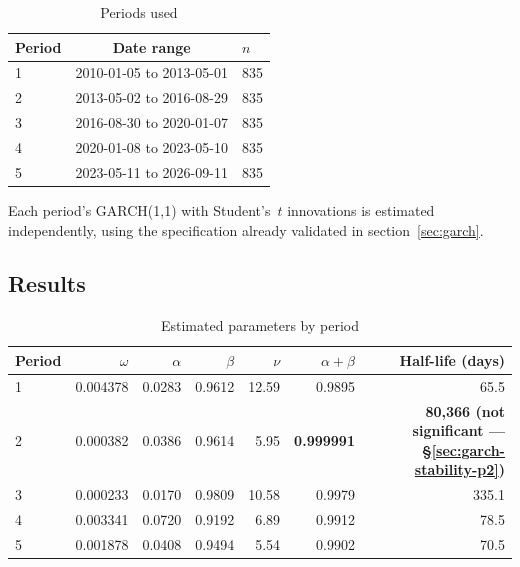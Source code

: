 \documentclass[12pt,a4paper]{article}
\begin{document}
\vspace{0.3cm}

\begin{table}[H]
	\centering
	\caption{Periods used}
	\begin{tabular}{|p{2.7cm}|c|p{3.2cm}|}
		\hline
		Period & Date range & $n$ \\
		\hline
		1 & 2010-01-05 to 2013-05-01 & 835 \\
		\hline
		2 & 2013-05-02 to 2016-08-29 & 835 \\
		\hline
		3 & 2016-08-30 to 2020-01-07 & 835 \\
		\hline
		4 & 2020-01-08 to 2023-05-10 & 835 \\
		\hline
		5 & 2023-05-11 to 2026-09-11 & 835 \\
		\hline
	\end{tabular}
\end{table}

\vspace{0.3cm}

Each period's GARCH(1,1) with Student's~$t$ innovations is
estimated independently, using the specification already validated in
section~\ref{sec:garch}.

\subsection{Results}

\begin{table}[H]
	\centering
	\small
	\caption{Estimated parameters by period}
	\begin{tabular}{lrrrrrr}
		\toprule
		Period & $\omega$ & $\alpha$ & $\beta$ & $\nu$ & $\alpha+\beta$ & Half-life (days) \\
		\midrule
		1 & 0.004378 & 0.0283 & 0.9612 & 12.59 & 0.9895 & 65.5 \\
		2 & 0.000382 & 0.0386 & 0.9614 & 5.95 & \textbf{0.999991} & \textbf{80,366 (not significant --- \S\ref{sec:garch-stability-p2})} \\
		3 & 0.000233 & 0.0170 & 0.9809 & 10.58 & 0.9979 & 335.1 \\
		4 & 0.003341 & 0.0720 & 0.9192 & 6.89 & 0.9912 & 78.5 \\
		5 & 0.001878 & 0.0408 & 0.9494 & 5.54 & 0.9902 & 70.5 \\
		\bottomrule
	\end{tabular}
\end{table}

\vspace{0.6cm}
\end{document}
